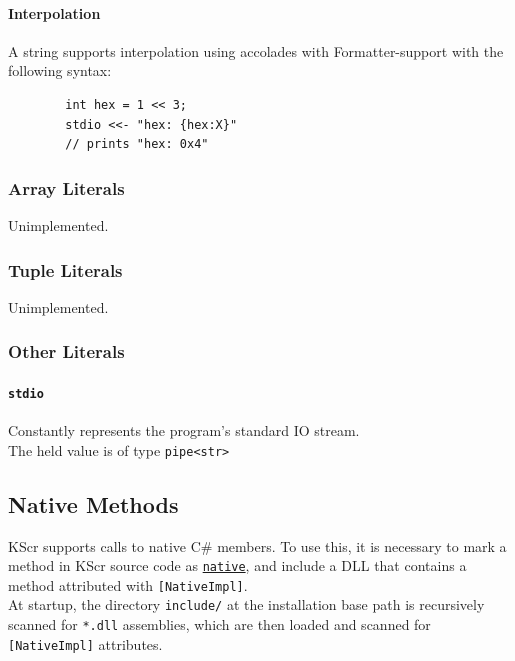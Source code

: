 \documentclass{docs}
\begin{document}
    \paragraph{Interpolation}
    A string supports interpolation using accolades with Formatter-support with the following syntax:
    \begin{verbatim}
        int hex = 1 << 3;
        stdio <<- "hex: {hex:X}"
        // prints "hex: 0x4"
    \end{verbatim}
    
    \label{litArray}
    \subsubsection{Array Literals}
    Unimplemented.
    
    \label{litTuple}
    \subsubsection{Tuple Literals}
    Unimplemented.
    
    \subsubsection{Other Literals}
    \label{litStdio}
    \paragraph{\texttt{stdio}}
    Constantly represents the program's standard IO stream. \\
    The held value is of type \texttt{pipe<str>}

    \subsection{Native Methods}
    KScr supports calls to native C\# members.
    To use this, it is necessary to mark a method in KScr source code as \hyperref[modNative]{\texttt{native}}, and include a DLL that contains a method attributed with \texttt{[NativeImpl]}.
    \\
    At startup, the directory \texttt{include/} at the installation base path is recursively scanned for \texttt{*.dll} assemblies, which are then loaded and scanned for \texttt{[NativeImpl]} attributes.
\end{document}
